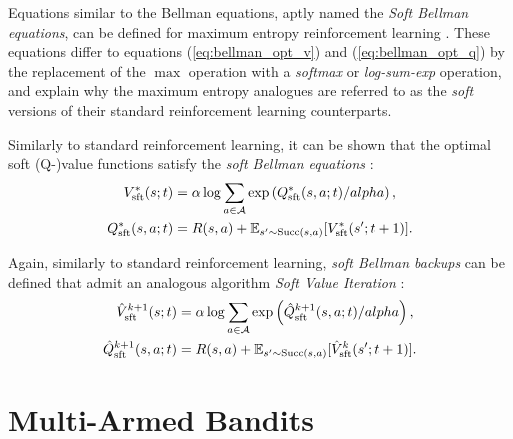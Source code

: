         Equations similar to the Bellman equations, aptly named the \textit{Soft Bellman equations}, can be defined for maximum entropy reinforcement learning . These equations differ to equations (\ref{eq:bellman_opt_v}) and (\ref{eq:bellman_opt_q}) by the replacement of the $\max$ operation with a \textit{softmax} or \textit{log-sum-exp} operation, and explain why the maximum entropy analogues are referred to as the \textit{soft} versions of their standard reinforcement learning counterparts.

        Similarly to standard reinforcement learning, it can be shown that the optimal soft (Q-)value functions satisfy the \textit{soft Bellman equations} :
        \begin{align}
            V_{{\textnormal{sft}}}^*(s;t) &= \alpha \log \sum_{a\in\mathcal{A}} \exp\left( Q_{{\textnormal{sft}}}^*(s,a;t) / alpha \right), \label{eq:sft_bellman_opt_v} \\
            Q_{{\textnormal{sft}}}^*(s,a;t) &= R(s,a) + \mathbb{E}_{s'\sim {\textnormal{Succ}(s,a)}} [V_{{\textnormal{sft}}}^*(s';t+1)]. \label{eq:sft_bellman_opt_q}
        \end{align} 

        Again, similarly to standard reinforcement learning, \textit{soft Bellman backups} can be defined that admit an analogous algorithm \textit{Soft Value Iteration} :
        \begin{align}
            \hat{V}_{{\textnormal{sft}}}^{k+1}(s;t) &= \alpha \log \sum_{a\in\mathcal{A}} \exp\left( \hat{Q}_{{\textnormal{sft}}}^{k+1}(s,a;t) / alpha \right), \\
            \hat{Q}_{{\textnormal{sft}}}^{k+1}(s,a;t) &= R(s,a) + \mathbb{E}_{s'\sim {\textnormal{Succ}(s,a)}} [\hat{V}_{{\textnormal{sft}}}^k(s';t+1)].
        \end{align}














\section{Multi-Armed Bandits}
\label{sec:2-3-mab}




